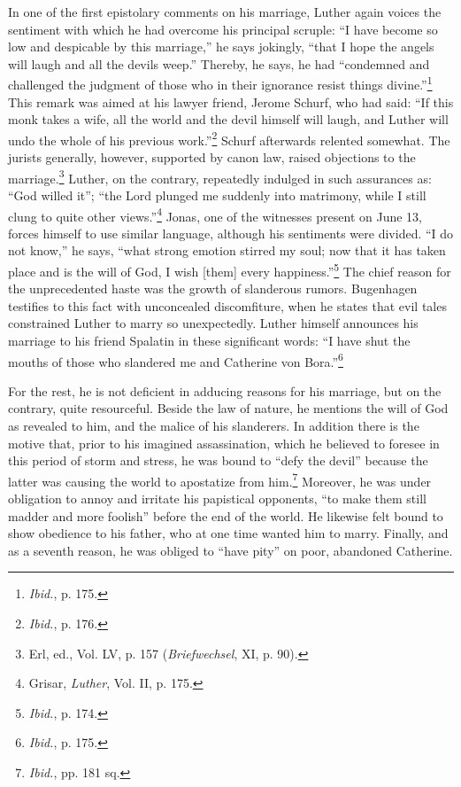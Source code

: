 In one of the first epistolary comments on his marriage, Luther
again voices the sentiment with which he had overcome his principal
scruple: “I have become so low and despicable by this marriage,” he
says jokingly, “that I hope the angels will laugh and all the devils
weep.” Thereby, he says, he had “condemned and challenged the judgment
of those who in their ignorance resist things divine.”\footnote{\textit{Ibid.}, p. 175.}
This remark was aimed at his lawyer friend, Jerome Schurf, who had said:
“If this monk takes a wife, all the world and the devil himself will
laugh, and Luther will undo the whole of his previous work.”\footnote{\textit{Ibid.}, p. 176.}
Schurf afterwards relented somewhat. The jurists generally, however,
supported by canon law, raised objections to the marriage.\footnote
{Erl, ed., Vol. LV, p. 157 (\textit{Briefwechsel}, XI, p. 90).}
Luther, on the contrary, repeatedly indulged in such assurances
as: “God willed it”; “the Lord plunged me suddenly into matrimony,
while I still clung to quite other views.”\footnote{Grisar, \textit{Luther}, Vol. II, p. 175.}
Jonas, one of the witnesses
present on June 13, forces himself to use similar language, although
his sentiments were divided. “I do not know,” he says, “what strong
emotion stirred my soul; now that it has taken place and is the will of
God, I wish [them] every happiness.”\footnote{\textit{Ibid.}, p. 174.}
The chief reason for the unprecedented
haste was the growth of slanderous rumors. Bugenhagen
testifies to this fact with unconcealed discomfiture, when he states that
evil tales constrained Luther to marry so unexpectedly. Luther himself
announces his marriage to his friend Spalatin in these significant
words: “I have shut the mouths of those who slandered me and
Catherine von Bora.”\footnote{\textit{Ibid.}, p. 175.}

For the rest, he is not deficient in adducing reasons for his marriage,
but on the contrary, quite resourceful. Beside the law of nature, he
mentions the will of God as revealed to him, and the malice of his
slanderers. In addition there is the motive that, prior to his imagined
assassination, which he believed to foresee in this period of storm and
stress, he was bound to “defy the devil” because the latter was causing
the world to apostatize from him.\footnote{\textit{Ibid.}, pp. 181 sq.}
Moreover, he was under obligation
to annoy and irritate his papistical opponents, “to make them
still madder and more foolish” before the end of the world. He likewise
felt bound to show obedience to his father, who at one time
wanted him to marry. Finally, and as a seventh reason, he was obliged
to “have pity” on poor, abandoned Catherine.

